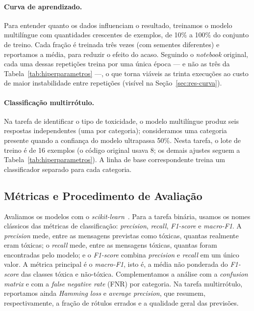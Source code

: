 \documentclass[sigconf, nonacm]{acmart}
\begin{document}
\paragraph{Curva de aprendizado.} Para entender quanto os dados influenciam
o resultado, treinamos o modelo multilíngue com quantidades crescentes de
exemplos, de 10\% a 100\% do conjunto de treino. Cada fração é treinada
três vezes (com sementes diferentes) e reportamos a média, para reduzir o
efeito do acaso. Seguindo o \emph{notebook} original, cada uma dessas
repetições treina por uma única época --- e não as três da
Tabela~\ref{tab:hiperparametros} ---, o que torna viáveis as trinta
execuções ao custo de maior instabilidade entre repetições (visível na
Seção~\ref{sec:res-curva}).
 
\paragraph{Classificação multirrótulo.} Na tarefa de identificar o tipo de
toxicidade, o modelo multilíngue produz seis respostas independentes (uma
por categoria); consideramos uma categoria presente quando a confiança do
modelo ultrapassa 50\%. Nesta tarefa, o lote de treino é de 16 exemplos
(o código original usava 8; os demais ajustes seguem a
Tabela~\ref{tab:hiperparametros}). A linha de base correspondente treina um
classificador separado para cada categoria.
 
\subsection{Métricas e Procedimento de Avaliação}
\label{sec:avaliacao}
 
Avaliamos os modelos com o \emph{scikit-learn}~\cite{pedregosa2011scikit}.
Para a tarefa binária, usamos os nomes clássicos das métricas de
classificação: \emph{precision}, \emph{recall}, \emph{F1-score} e
\emph{macro-F1}. A \emph{precision} mede, entre as mensagens previstas
como tóxicas, quantas realmente eram tóxicas; o \emph{recall} mede, entre
as mensagens tóxicas, quantas foram encontradas pelo modelo; e o
\emph{F1-score} combina \emph{precision} e \emph{recall} em um único
valor. A métrica principal é o \emph{macro-F1}, isto é, a média não
ponderada do \emph{F1-score} das classes tóxica e não-tóxica.
Complementamos a análise com a \emph{confusion matrix} e com a
\emph{false negative rate} (FNR) por categoria. Na tarefa multirrótulo,
reportamos ainda \emph{Hamming loss} e \emph{average precision}, que
resumem, respectivamente, a fração de rótulos errados e a qualidade geral
das previsões.
 
\end{document}
